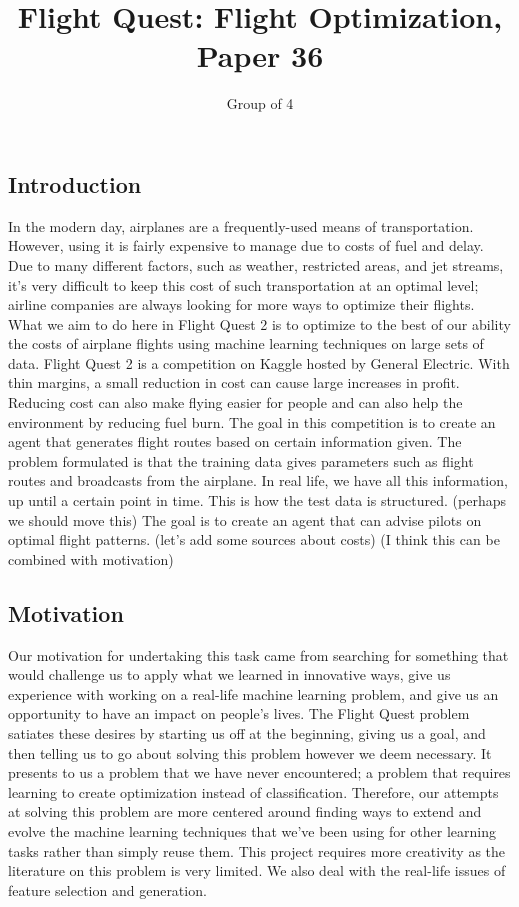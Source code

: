 \documentclass{article}[12pt]
\begin{document}
\title{Flight Quest: Flight Optimization, Paper 36}
\author{
	Group of 4
}
\date{}
\maketitle

\setlength{\columnsep}{1cm}
\begin{multicols}{2}

\section{Introduction}
In the modern day, airplanes are a frequently-used means of transportation. However, using it is fairly expensive to manage due to costs of fuel and delay. Due to many different factors, such as weather, restricted areas, and jet streams, it's very difficult to keep this cost of such transportation at an optimal level; airline companies are always looking for more ways to optimize their flights. What we aim to do here in Flight Quest 2 is to optimize to the best of our ability the costs of airplane flights using machine learning techniques on large sets of data. Flight Quest 2 is a competition on Kaggle hosted by General Electric. With thin margins, a small reduction in cost can cause large increases in profit. Reducing cost can also make flying easier for people and can also help the environment by reducing fuel burn. The goal in this competition is to create an agent that generates flight routes based on certain information given. The problem formulated is that the training data gives parameters such as flight routes and broadcasts from the airplane. In real life, we have all this information, up until a certain point in time. This is how the test data is structured. (perhaps we should move this) The goal is to create an agent that can advise pilots on optimal flight patterns. (let's add some sources about costs) (I think this can be combined with motivation)

\subsection{Motivation}
Our motivation for undertaking this task came from searching for something that would challenge us to apply what we learned in innovative ways, give us experience with working on a real-life machine learning problem, and give us an opportunity to have an impact on people's lives. The Flight Quest problem satiates these desires by starting us off at the beginning, giving us a goal, and then telling us to go about solving this problem however we deem necessary. It presents to us a problem that we have never encountered; a problem that requires learning to create optimization instead of classification. Therefore, our attempts at solving this problem are more centered around finding ways to extend and evolve the machine learning techniques that we've been using for other learning tasks rather than simply reuse them. This project requires more creativity as the literature on this problem is very limited. We also deal with the real-life issues of feature selection and generation. 
 

\end{multicols}
\end{document}
